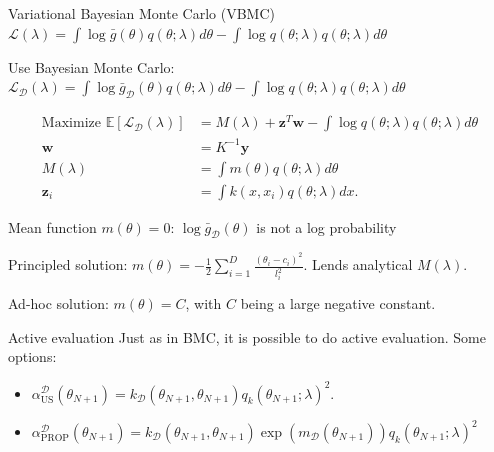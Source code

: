 \documentclass{beamer}
\def \Ev {{\mathbb E}}
\def \gu {{\bar{g}}}
\begin{document}
\begin{frame}{}
\begin{block}{Variational Bayesian Monte Carlo (VBMC)}
$\mathcal{L}(\lambda) = 
\int \log \gu(\theta) q(\theta;\lambda) d\theta - \int \log q(\theta;\lambda) q(\theta;\lambda) d\theta$

Use Bayesian Monte Carlo:
$\mathcal{L}_\mathcal{D}(\lambda) = 
\int \log \gu_\mathcal{D}(\theta) q(\theta;\lambda) d\theta - \int \log q(\theta;\lambda) q(\theta;\lambda) d\theta$

\begin{block}{}
\begin{equation*}
\begin{split}
\text{Maximize } \Ev[\mathcal{L}_\mathcal{D}(\lambda)] & = M(\lambda) + \mathbf{z}^T \mathbf{w} - \int \log q(\theta;\lambda) q(\theta;\lambda) d\theta\\
\mathbf{w} & = K^{-1} \mathbf{y} \\
M(\lambda) & = \int m(\theta) q(\theta;\lambda) d\theta \\
\mathbf{z}_i & = \int k(x,x_i) q(\theta;\lambda) dx.
\end{split}
\end{equation*}

\end{block}
\end{block}
\end{frame}

\begin{frame}{}
\begin{block}{Mean function}
$m(\theta) = 0$: $\log \gu_\mathcal{D}(\theta)$ is not a log probability

Principled solution: $m(\theta) = -\frac{1}{2} \sum_{i=1}^D \frac{(\theta_i - c_i)^2}{l_i^2}$. Lends analytical $M(\lambda)$.

Ad-hoc solution: $m(\theta) = C$, with $C$ being a large negative constant.
\end{block}

\begin{block}{Active evaluation}
Just as in BMC, it is possible to do active evaluation.
Some options:
\begin{itemize}
\item $\alpha^\mathcal{D}_{\text{US}}(\theta_{N+1}) = k_\mathcal{D}(\theta_{N+1},\theta_{N+1}) q_k(\theta_{N+1};\lambda)^2.$
\item $\label{prospective_vbmc}
\alpha^\mathcal{D}_{\text{PROP}}(\theta_{N+1}) = k_\mathcal{D}(\theta_{N+1},\theta_{N+1}) \exp(m_\mathcal{D}(\theta_{N+1}))q_k(\theta_{N+1};\lambda)^2$
\end{itemize}
\end{block}
\end{frame}
\end{document}
